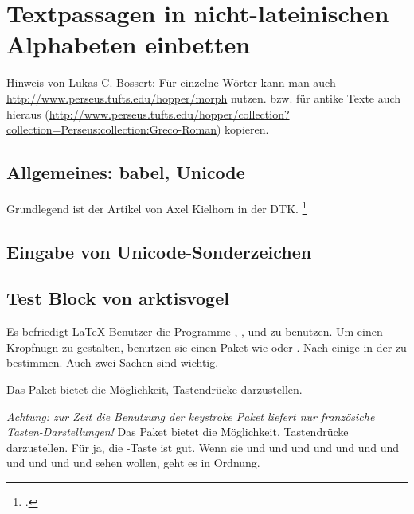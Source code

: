\usepackage[german]{keystroke}%
\chapter{Textpassagen in nicht-lateinischen Alphabeten einbetten}

Hinweis von Lukas C. Bossert:
Für einzelne Wörter kann man auch \url{http://www.perseus.tufts.edu/hopper/morph} nutzen.
bzw. für antike Texte auch hieraus (\url{http://www.perseus.tufts.edu/hopper/collection?collection=Perseus:collection:Greco-Roman}) kopieren.

\section{Allgemeines: babel, Unicode}

Grundlegend ist der Artikel von Axel Kielhorn in der DTK.%
\footcite{kielhorn:dtk2014}

\section{Eingabe von Unicode-Sonderzeichen}
\label{unicodeeingabe}

\label{unicodeviaemacs}

\section{Test Block von arktisvogel}

\label{cpftestalpha}

Es befriedigt \LaTeX{}-Benutzer die Programme \LuaLaTeX ,
\METAFONT , \pdfLaTeX und \XeLaTeX{} zu benutzen. Um einen
Kropfnugn zu gestalten, benutzen sie einen Paket wie
 oder .
Nach einige  in der
 zu bestimmen. Auch zwei
 Sachen sind
 wichtig.

\label{cpftestbety}

Das Paket  bietet die Möglichkeit,
Tastendrücke darzustellen.


\textit{Achtung: zur Zeit die Benutzung der keystroke Paket
liefert nur französiche Tasten-Darstellungen!}\/ Das
Paket  bietet die Möglichkeit,
Tastendrücke darzustellen. Für ja,
die \hbox{-Taste} ist gut. Wenn sie \Del{} und %
\Ins{}%
und %
\Esc{}%
und %
\Shift{}%
und %
\Ctrl{}%
und %
\Home{}%
und %
\End{}%
und %
\PgUp{}%
und %
\PgDown{}%
und %
\PrtScroll{}%
und %
\Spacebar{}%
und %
\Break{} sehen wollen, geht es in Ordnung.

